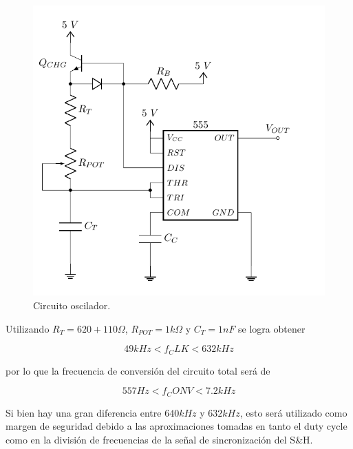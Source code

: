 \begin{figure}[H]
\centering
\includegraphics[width=0.8\linewidth, page=1]{ImagenesEjercicio1/Components.pdf}
\caption{Circuito oscilador.}
\label{555}
\end{figure}

Utilizando $R_{T} = 620 + 110\Omega$, $R_{POT} = 1k\Omega$ y $C_{T} = 1nF$ se logra obtener

\[ 49kHz < f_CLK < 632kHz\]

por lo que la frecuencia de conversión del circuito total será de

\[ 557Hz < f_CONV < 7.2kHz \]

Si bien hay una gran diferencia entre $640kHz$ y $632kHz$, esto será utilizado como margen de seguridad debido a las aproximaciones tomadas en tanto el duty cycle como en la división de frecuencias de la señal de sincronización del S\&H.

